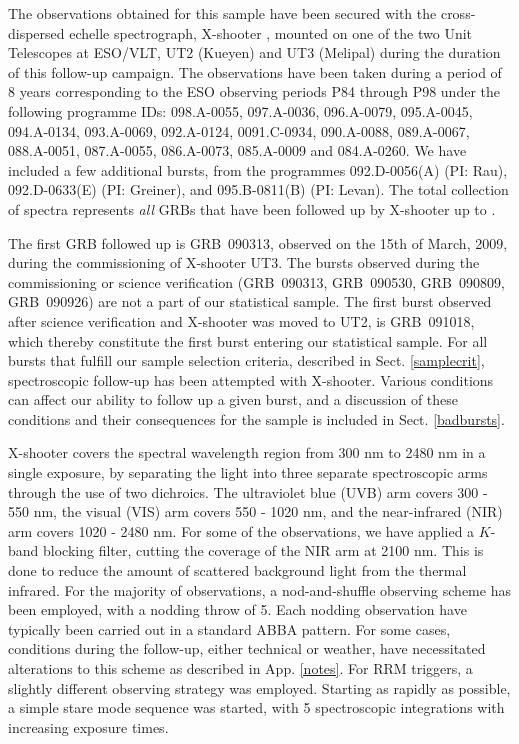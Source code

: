 \documentclass{aa}    %
\begin{document}
The observations obtained for this sample have been secured with the
cross-dispersed echelle spectrograph, X-shooter \citep{Vernet2011}, mounted on
one of the two Unit Telescopes at ESO/VLT, UT2 (Kueyen) and UT3 (Melipal) during
the duration of this follow-up campaign. The observations have been taken during
a period of 8 years corresponding to the ESO observing periods P84 through P98
under the following programme IDs: 098.A-0055, 097.A-0036, 096.A-0079,
095.A-0045, 094.A-0134, 093.A-0069, 092.A-0124, 0091.C-0934, 090.A-0088,
089.A-0067, 088.A-0051, 087.A-0055, 086.A-0073, 085.A-0009 and 084.A-0260. We
have included a few additional bursts, from the programmes 092.D-0056(A) (PI:
Rau), 092.D-0633(E) (PI: Greiner), and 095.B-0811(B) (PI: Levan). The total
collection of spectra represents \textit{all} GRBs that have been followed up by
X-shooter up to \termdate.

The first GRB followed up is GRB~090313, observed on the 15th of March, 2009,
during the commissioning of X-shooter UT3. The bursts observed during the
commissioning or science verification (GRB~090313, GRB~090530, GRB~090809,
GRB~090926) are not a part of our statistical sample. The first burst observed
after science verification and X-shooter was moved to UT2, is GRB~091018, which
thereby constitute the first burst entering our statistical sample. For all
bursts that fulfill our sample selection criteria, described in Sect.
\ref{samplecrit}, spectroscopic follow-up has been attempted with X-shooter.
Various conditions can affect our ability to follow up a given burst, and a
discussion of these conditions and their consequences for the sample is
included in Sect. \ref{badbursts}.

X-shooter covers the spectral wavelength region from 300 nm to 2480 nm in a
single exposure, by separating the light into three separate spectroscopic arms
through the use of two dichroics. The ultraviolet blue (UVB) arm covers 300 -
550 nm, the visual (VIS) arm covers 550 - 1020 nm, and the near-infrared (NIR)
arm covers 1020 - 2480 nm. For some of the observations, we have applied a
$K$-band blocking filter, cutting the coverage of the NIR arm at 2100 nm. This
is done to reduce the amount of scattered background light from the thermal
infrared. For the majority of observations, a nod-and-shuffle observing scheme
has been employed, with a nodding throw of 5\arcsec. Each nodding observation
have typically been carried out in a standard ABBA pattern. For some cases,
conditions during the follow-up, either technical or weather, have necessitated
alterations to this scheme as described in App. \ref{notes}. For RRM triggers, a
slightly different observing strategy was employed. Starting as rapidly as
possible, a simple stare mode sequence was started, with 5 spectroscopic
integrations with increasing exposure times. 
\end{document}
